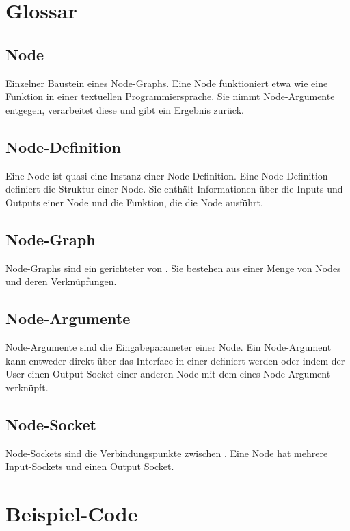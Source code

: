 \documentclass[ngerman]{article}
\begin{document}
\pagebreak
\section{Glossar}

\subsection{Node}
\label{sec:node}
Einzelner Baustein eines \hyperref[sec:node_graph]{Node-Graphs}. Eine Node funktioniert etwa wie eine Funktion in einer textuellen Programmiersprache. Sie nimmt \hyperref[sec:node_argumente]{Node-Argumente} entgegen, verarbeitet diese und gibt ein Ergebnis zurück. 


\subsection{Node-Definition}
\label{sec:node_definition}
Eine Node ist quasi eine Instanz einer Node-Definition. Eine Node-Definition definiert die Struktur einer Node. Sie enthält Informationen über die Inputs und Outputs einer Node und die Funktion, die die Node ausführt.

\subsection{Node-Graph}
\label{sec:node_graph}
Node-Graphs sind ein gerichteter  von . Sie bestehen aus einer Menge von Nodes und deren Verknüpfungen. 

\subsection{Node-Argumente}
\label{sec:node_argumente}
Node-Argumente sind die Eingabeparameter einer Node. Ein Node-Argument kann entweder direkt über das Interface in einer  definiert werden oder indem der User einen Output-Socket einer anderen Node mit dem  eines Node-Argument verknüpft.

\subsection{Node-Socket}
\label{sec:node_socket}
Node-Sockets sind die Verbindungspunkte zwischen . Eine Node hat mehrere Input-Sockets und einen Output Socket.

\pagebreak

\section{Beispiel-Code}
\end{document}

